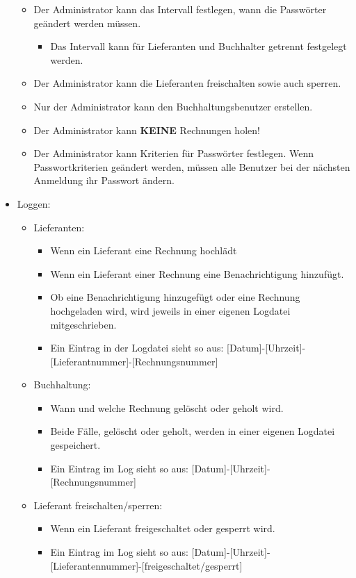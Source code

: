 \begin{itemize}
\begin{itemize}
\item Der Administrator kann das Intervall festlegen, wann die Passwörter
geändert werden müssen. 

\begin{itemize}
\item Das Intervall kann für Lieferanten und Buchhalter getrennt festgelegt
werden. 
\end{itemize}
\item Der Administrator kann die Lieferanten freischalten sowie auch sperren. 
\item Nur der Administrator kann den Buchhaltungsbenutzer erstellen. 
\item Der Administrator kann \textbf{\small{}KEINE} Rechnungen holen! 
\item Der Administrator kann Kriterien für Passwörter festlegen. Wenn Passwortkriterien
geändert werden, müssen alle Benutzer bei der nächsten Anmeldung ihr
Passwort ändern.
\end{itemize}
\item Loggen: 

\begin{itemize}
\item Lieferanten: 

\begin{itemize}
\item Wenn ein Lieferant eine Rechnung hochlädt 
\item Wenn ein Lieferant einer Rechnung eine Benachrichtigung hinzufügt. 
\item Ob eine Benachrichtigung hinzugefügt oder eine Rechnung hochgeladen
wird, wird jeweils in einer eigenen Logdatei mitgeschrieben. 
\item Ein Eintrag in der Logdatei sieht so aus: {[}Datum{]}-{[}Uhrzeit{]}-{[}Lieferantnummer{]}-{[}Rechnungsnummer{]} 
\end{itemize}
\item Buchhaltung: 

\begin{itemize}
\item Wann und welche Rechnung gelöscht oder geholt wird. 
\item Beide Fälle, gelöscht oder geholt, werden in einer eigenen Logdatei
gespeichert. 
\item Ein Eintrag im Log sieht so aus: {[}Datum{]}-{[}Uhrzeit{]}-{[}Rechnungsnummer{]} 
\end{itemize}
\item Lieferant freischalten/sperren: 

\begin{itemize}
\item Wenn ein Lieferant freigeschaltet oder gesperrt wird. 
\item Ein Eintrag im Log sieht so aus: {[}Datum{]}-{[}Uhrzeit{]}-{[}Lieferantennummer{]}-{[}freigeschaltet/gesperrt{]} 
\end{itemize}
\end{itemize}
\end{itemize}

